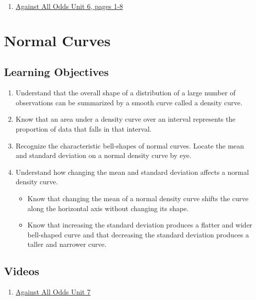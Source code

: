 \documentclass[letterpaper,9pt,twocolumn,twoside,printwatermark=false]{pinp}
\providecommand{\tightlist}{%
  \setlength{\itemsep}{0pt}\setlength{\parskip}{0pt}}
\begin{document}
\begin{enumerate}
\item \href{https://www.learner.org/courses/againstallodds/pdfs/AgainstAllOdds_StudentGuide_Unit06.pdf#page=1}{Against All Odds Unit 6, pages 1-8}
\end{enumerate}

\section{Normal Curves}\label{normal-curves}

\subsection{Learning Objectives}\label{learning-objectives-2}

\begin{enumerate}
\def\labelenumi{\arabic{enumi}.}
\tightlist
\item
  Understand that the overall shape of a distribution of a large number
  of observations can be summarized by a smooth curve called a density
  curve.
\item
  Know that an area under a density curve over an interval represents
  the proportion of data that falls in that interval.
\item
  Recognize the characteristic bell-shapes of normal curves. Locate the
  mean and standard deviation on a normal density curve by eye.
\item
  Understand how changing the mean and standard deviation affects a
  normal density curve.

  \begin{itemize}
  \tightlist
  \item
    Know that changing the mean of a normal density curve shifts the
    curve along the horizontal axis without changing its shape.
  \item
    Know that increasing the standard deviation produces a flatter and
    wider bell-shaped curve and that decreasing the standard deviation
    produces a taller and narrower curve.
  \end{itemize}
\end{enumerate}

\subsection{Videos}\label{videos-2}

\begin{enumerate}
\def\labelenumi{\arabic{enumi}.}
\tightlist
\item
  \href{https://www.learner.org/courses/againstallodds/unitpages/unit07.html}{Against
  All Odds Unit 7}
\end{enumerate}
\end{document}
